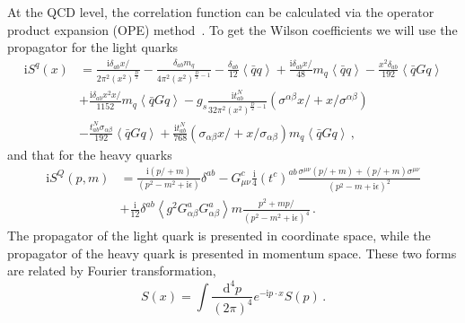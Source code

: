 \documentclass[prd,showpacs,showkeys,floatfix,amsmath,amssymb,floatfix,english]{revtex4}
\begin{document}
At the QCD level, the correlation function can be calculated via the
operator product expansion (OPE)
method~\cite{1969-Wilson-p1499-1512}. To get the Wilson coefficients
we will use the propagator for the light quarks
\begin{align}
\mathrm{i}S^{q}\left(x\right) & =\frac{\mathrm{i}\delta_{ab}x\!\!\!/}{2\pi^{2}\left(x^{2}\right)^{\frac{D}{2}}}-\frac{\delta_{ab}m_{q}}{4\pi^{2}\left(x^{2}\right)^{\frac{D}{2}-1}}-\frac{\delta_{ab}}{12}\left\langle \bar{q}q\right\rangle +\frac{\mathrm{i}\delta_{ab}x\!\!\!/}{48}m_{q}\left\langle \bar{q}q\right\rangle -\frac{x^{2}\delta_{ab}}{192}\left\langle \bar{q}Gq\right\rangle \nonumber \\
 & +\frac{\mathrm{i}\delta_{ab}x^{2}x\!\!\!/}{1152}m_{q}\left\langle \bar{q}Gq\right\rangle -g_{s}\frac{\mathrm{i}t_{ab}^{N}}{32\pi^{2}\left(x^{2}\right)^{\frac{D}{2}-1}}\left(\sigma^{\alpha\beta}x\!\!\!/+x\!\!\!/\sigma^{\alpha\beta}\right)\nonumber \\
 & -\frac{t_{ab}^{N}\sigma_{\alpha\beta}}{192}\left\langle \bar{q}Gq\right\rangle +\frac{\mathrm{i}t_{ab}^{N}}{768}\left(\sigma_{\alpha\beta}x\!\!\!/+x\!\!\!/\sigma_{\alpha\beta}\right)m_{q}\left\langle \bar{q}Gq\right\rangle\, ,
\end{align}
and that for the heavy quarks
\begin{align}
\mathrm{i}S^{Q}\left(p,m\right) & =\frac{\mathrm{i}\left(p\!\!\!/+m\right)}{\left(p^{2}-m^{2}+\mathrm{i}\epsilon\right)}\delta^{ab}-G_{\mu\nu}^{c}\frac{\mathrm{i}}{4}\left(t^{c}\right)^{ab}\frac{\sigma^{\mu\nu}\left(p\!\!\!/+m\right)+\left(p\!\!\!/+m\right)\sigma^{\mu\nu}}{\left(p^{2}-m+\mathrm{i}\epsilon\right)^{2}}\nonumber \\
 & +\frac{\mathrm{i}}{12}\delta^{ab}\left\langle g^{2}G_{\alpha\beta}^{a}G_{\alpha\beta}^{a}\right\rangle m\frac{p^{2}+mp\!\!\!/}{\left(p^{2}-m^{2}+\mathrm{i}\epsilon\right)^{4}}\, .
\end{align}
The propagator of the light quark is presented in coordinate space,
while the propagator of the heavy quark is presented in momentum
space. These two forms are related by Fourier transformation,
\begin{equation}
S\left(x\right)=\int\frac{\mathrm{d}^{4}p}{\left(2\pi\right)^{4}}e^{-\mathrm{i}p\cdot
x}S\left(p\right)\, .
\end{equation}
\end{document}
